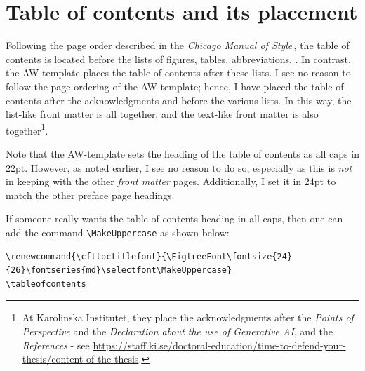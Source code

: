 \documentclass[12pt, twoside]{article}
\begin{document}



\section{Table of contents and its placement}
\label{sec:cycle3TableOfContents}

Following the page order described in the \textit{Chicago Manual of Style}\,\cite{university_of_chicago_press_chicago_1982}, the table of contents is located before the lists of figures, tables, abbreviations, \etc. In contrast, the AW-template places the table of contents after these lists. I see no reason to follow the page ordering of the AW-template; hence, I have placed the table of contents after the acknowledgments and before the various lists. In this way, the list-like front matter is all together, and the text-like front matter is also together\footnote{At Karolinska Institutet, they place the acknowledgments after the \textit{Points of Perspective} and the \textit{Declaration about the use of Generative AI}, and the \textit{References} - see \url{https://staff.ki.se/doctoral-education/time-to-defend-your-thesis/content-of-the-thesis}.}.

Note that the AW-template sets the heading of the table of contents as all caps in 22pt. However, as noted earlier, I see no reason to do so, especially as this is \textit{not} in keeping with the other \textit{front matter} pages. Additionally, I set it in 24pt to match the other preface page headings.

If someone really wants the table of contents heading in all caps, then one can add the command \texttt{\textbackslash MakeUppercase} as shown below:
\begin{lstlisting}[style=latexExampleForAuthors]
\renewcommand{\cfttoctitlefont}{\FigtreeFont\fontsize{24}{26}\fontseries{md}\selectfont\MakeUppercase}
\tableofcontents
\end{lstlisting}
\end{document}
